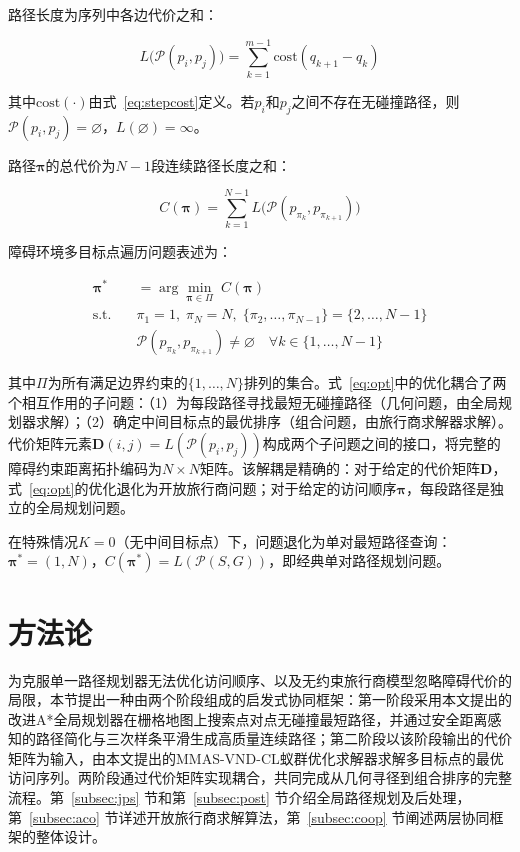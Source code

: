\documentclass[lettersize,journal]{IEEEtran}
\begin{document}
路径长度为序列中各边代价之和：

\begin{equation}
L\big(\mathcal{P}(p_i, p_j)\big) = \sum_{k=1}^{m-1} \mathrm{cost}(q_{k+1} - q_k)
\label{eq:pathlen}
\end{equation}

其中$\mathrm{cost}(\cdot)$由式~\eqref{eq:stepcost}定义。若$p_i$和$p_j$之间不存在无碰撞路径，则$\mathcal{P}(p_i, p_j) = \varnothing$，$L(\varnothing) = \infty$。

路径$\bm{\pi}$的总代价为$N-1$段连续路径长度之和：

\begin{equation}
C(\bm{\pi}) = \sum_{k=1}^{N-1} L\big(\mathcal{P}(p_{\pi_k}, p_{\pi_{k+1}})\big)
\label{eq:totalcost}
\end{equation}

障碍环境多目标点遍历问题表述为：

\begin{align}
\bm{\pi}^{*} &= \arg\min_{\bm{\pi} \in \Pi} \; C(\bm{\pi})
\label{eq:opt}\\
\text{s.t.} \quad &\pi_1 = 1,\; \pi_N = N,\; \{\pi_2, \dots, \pi_{N-1}\} = \{2, \dots, N-1\} \nonumber\\
&\mathcal{P}(p_{\pi_k}, p_{\pi_{k+1}}) \neq \varnothing \quad \forall k \in \{1, \dots, N-1\} \nonumber
\end{align}

其中$\Pi$为所有满足边界约束的$\{1, \dots, N\}$排列的集合。式~\eqref{eq:opt}中的优化耦合了两个相互作用的子问题：（1）为每段路径寻找最短无碰撞路径（几何问题，由全局规划器求解）；（2）确定中间目标点的最优排序（组合问题，由旅行商求解器求解）。代价矩阵元素$\mathbf{D}(i, j) = L(\mathcal{P}(p_i, p_j))$构成两个子问题之间的接口，将完整的障碍约束距离拓扑编码为$N \times N$矩阵。该解耦是精确的：对于给定的代价矩阵$\mathbf{D}$，式~\eqref{eq:opt}的优化退化为开放旅行商问题；对于给定的访问顺序$\bm{\pi}$，每段路径是独立的全局规划问题。

在特殊情况$K = 0$（无中间目标点）下，问题退化为单对最短路径查询：$\bm{\pi}^{*} = (1, N)$，$C(\bm{\pi}^{*}) = L(\mathcal{P}(S, G))$，即经典单对路径规划问题。

\section{方法论}

\label{sec:method}

为克服单一路径规划器无法优化访问顺序、以及无约束旅行商模型忽略障碍代价的局限，本节提出一种由两个阶段组成的启发式协同框架：第一阶段采用本文提出的改进A*全局规划器在栅格地图上搜索点对点无碰撞最短路径，并通过安全距离感知的路径简化与三次样条平滑生成高质量连续路径；第二阶段以该阶段输出的代价矩阵为输入，由本文提出的MMAS-VND-CL蚁群优化求解器求解多目标点的最优访问序列。两阶段通过代价矩阵实现耦合，共同完成从几何寻径到组合排序的完整流程。第~\ref{subsec:jps} 节和第~\ref{subsec:post} 节介绍全局路径规划及后处理，第~\ref{subsec:aco} 节详述开放旅行商求解算法，第~\ref{subsec:coop} 节阐述两层协同框架的整体设计。
\end{document}
